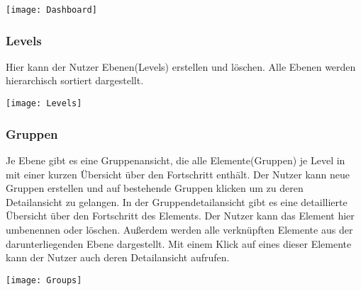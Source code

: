 \vspace{20pt}
\begin{center}
    \begin{minipage}{\linewidth}
        \texttt{[image: Dashboard]}
    \end{minipage}
\end{center}
\vspace{20pt}

\subsubsection{Levels}
Hier kann der Nutzer Ebenen(Levels) erstellen und löschen. Alle Ebenen werden hierarchisch sortiert dargestellt.

\vspace{20pt}
\begin{center}
    \begin{minipage}{\linewidth}
        \texttt{[image: Levels]}
    \end{minipage}
\end{center}
\vspace{20pt}

\subsubsection{Gruppen}
Je Ebene gibt es eine Gruppenansicht, die alle Elemente(Gruppen) je Level in mit einer kurzen Übersicht über den Fortschritt enthält. Der Nutzer kann neue Gruppen erstellen und auf bestehende Gruppen klicken um zu deren Detailansicht zu gelangen.
In der Gruppendetailansicht gibt es eine detaillierte Übersicht über den Fortschritt des Elements. Der Nutzer kann das Element hier umbenennen oder löschen. Außerdem werden alle verknüpften Elemente aus der darunterliegenden Ebene dargestellt. Mit einem Klick auf eines dieser Elemente kann der Nutzer auch deren Detailansicht aufrufen.

\vspace{20pt}
\begin{center}
    \begin{minipage}{\linewidth}
        \texttt{[image: Groups]}
    \end{minipage}
\end{center}
\vspace{20pt}

